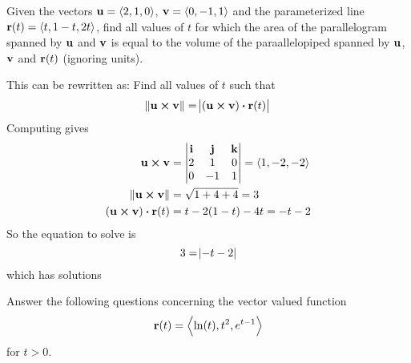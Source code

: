 \documentclass[12pt,answers]{exam}
\newcommand{\vect}[1]{\left\langle #1\right\rangle}
\newcommand{\vbi}{\vb{i}}
\newcommand{\vbj}{\vb{j}}
\newcommand{\vbk}{\vb{k}}
\newcommand{\vbr}{\vb{r}}
\newcommand{\vbu}{\vb{u}}
\newcommand{\vbv}{\vb{v}}
\begin{document}
\begin{questions}
\question[10]
Given the vectors $\vbu = \vect{2,1,0}$, $\vbv = \vect{0,-1,1}$ and the parameterized line $\vbr(t) = \vect{t,1-t,2t}$, find all values of $t$ for which the area of the parallelogram spanned by $\vbu$ and $\vbv$ is equal to the volume of the paraallelopiped spanned by $\vbu$, $\vbv$ and $\vbr(t)$ (ignoring units).
\begin{solution}
  This can be rewritten as: 
  Find all values of $t$ such that  
  \[
    \norm{\vbu\cross\vbv} = \abs{(\vbu\cross\vbv)\vdot\vbr(t)}
  \]
Computing gives
\begin{align*}
  \vbu\cross\vbv &= \mqty| \vbi & \vbj & \vbk \\ 2 & 1 & 0 \\ 0 & -1 & 1 | = \vect{1,-2,-2} \\ 
  \norm{\vbu\cross\vbv} &= \sqrt{1+4+4} = 3 \\
  (\vbu\cross\vbv)\vdot\vbr(t) &= t - 2(1-t)-4t = -t-2
\end{align*}
So the equation to solve is
\[
  3 = \abs{-t-2}
\]
which has solutions 
\end{solution}

\newpage
\question
Answer the following questions concerning the vector valued function
\[
  \vbr(t) = \vect{\ln(t), t^2, e^{t-1}}
\]
for $t > 0$.


\end{questions}
\end{document}
